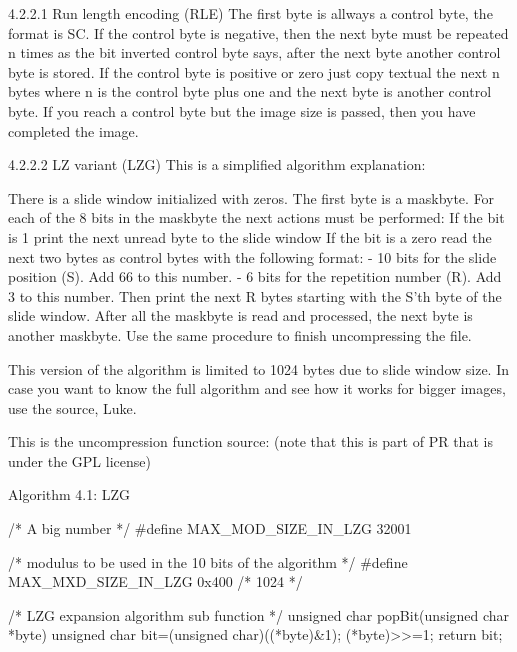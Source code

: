 4.2.2.1 Run length encoding (RLE)
 The first byte is allways a control byte, the format is SC. If the control
 byte is negative, then the next byte must be repeated n times as the bit
 inverted control byte says, after the next byte another control byte is
 stored.
 If the control byte is positive or zero just copy textual the next n bytes
 where n is the control byte plus one and the next byte is another control
 byte.
 If you reach a control byte but the image size is passed, then you have
 completed the image.

4.2.2.2 LZ variant (LZG)
 This is a simplified algorithm explanation:

 There is a slide window initialized with zeros.
 The first byte is a maskbyte.
 For each of the 8 bits in the maskbyte the next actions must be performed:
  If the bit is 1 print the next unread byte to the slide window
  If the bit is a zero read the next two bytes as control bytes with the
  following format:
   - 10 bits for the slide position (S). Add 66 to this number.
   - 6 bits for the repetition number (R). Add 3 to this number.
   Then print the next R bytes starting with the S'th byte of the slide
   window.
 After all the maskbyte is read and processed, the next byte is another
 maskbyte. Use the same procedure to finish uncompressing the file.

 This version of the algorithm is limited to 1024 bytes due to slide window
 size. In case you want to know the full algorithm and see how it works for
 bigger images, use the source, Luke.

 This is the uncompression function source:
 (note that this is part of PR that is under the GPL license)

                   Algorithm 4.1: LZG
                   ~~~~~~~~~~~~~~~~~~

 /* A big number */
 #define MAX_MOD_SIZE_IN_LZG    32001

 /* modulus to be used in the 10 bits of the algorithm */
 #define MAX_MXD_SIZE_IN_LZG    0x400 /* 1024 */

 /* LZG expansion algorithm sub function */
 unsigned char popBit(unsigned char *byte) {
   unsigned char bit=(unsigned char)((*byte)&1);
   (*byte)>>=1;
   return bit;
 }

